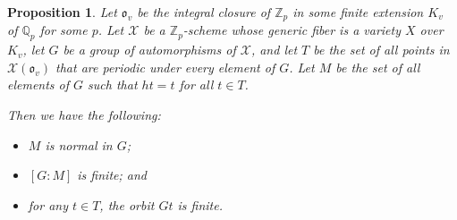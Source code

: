 \documentclass{amsart}
\newcommand{\bZ} {\mathbb{Z}}
\newcommand{\bQ}{\mathbb{Q}}
\newcommand{\fo}{\mathfrak o}
\newcommand{\cX}{\mathcal X}
\newtheorem{prop}[thm]{Proposition}
\theoremstyle{definition}
\begin{document}
\begin{prop}\label{burn1}
Let $\fo_v$ be the integral closure of $\bZ_p$ in some finite extension
$K_v$ of $\bQ_p$ for some $p$.  Let $\cX$ be a $\bZ_p$-scheme
whose generic fiber is a variety $X$ over $K_v$, let $G$ be a group
of automorphisms of $\cX$, and let $T$ be the set
of all points in $\cX(\fo_v)$ that are periodic under every element of
$G$.  Let $M$ be the set of all elements of $G$ such that $ht = t$ for
all $t \in T$.  

Then we have the following:
\begin{itemize}
\item [(i)] $M$ is normal in $G$;
\item[(ii)] $[G:M]$ is finite; and
  \item [(iii)] for any $t \in T$, the orbit $Gt$ is finite. 
\end{itemize}
\end{prop}
\end{document}
